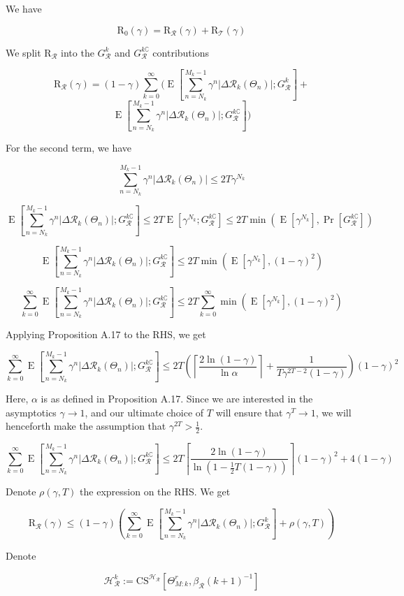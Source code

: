 \documentclass[a4paper]{article}
\newcommand{\AP}[1]{\left(#1\right)}
\newcommand{\AB}[1]{\left[#1\right]}
\newcommand{\Abs}[1]{\left\vert #1 \right\vert}
\newcommand{\Ceil}[1]{\left\lceil #1 \right\rceil}
\newcommand{\Pb}[1]{\operatorname{Pr}\AB{#1}}
\newcommand{\E}[1]{\operatorname{E}\AB{#1}}
\newcommand{\R}{\mathcal{R}}
\newcommand{\T}{\mathcal{T}}
\newcommand{\Hy}{\mathcal{H}}
\newcommand{\Reg}{\mathrm{R}}
\newcommand{\ET}{N}
\newcommand{\IT}{M}
\newcommand{\CSE}{G}
\newcommand{\CS}{\mathrm{CS}}
\begin{document}
We have

$$\Reg_0(\gamma)=\Reg_{\R}(\gamma)+\Reg_{\T}(\gamma)$$

We split $\Reg_{\R}$ into the $\CSE_\R^k$ and $\CSE_\R^{k\complement}$ contributions

$$\Reg_{\R}(\gamma)=(1-\gamma)\sum_{k=0}^\infty\Bigg(\E{\sum_{n=\ET_k}^{\IT_k-1}\gamma^{n}\Abs{\Delta\R_k\AP{\Theta_n}};\CSE_\R^k}+$$
$$\E{\sum_{n=\ET_k}^{\IT_k-1}\gamma^{n}\Abs{\Delta\R_k\AP{\Theta_n}};\CSE_\R^{k\complement}}\Bigg)$$

For the second term, we have

$$\sum_{n=\ET_k}^{\IT_k-1}\gamma^{n}\Abs{\Delta\R_k\AP{\Theta_n}}\leq2T\gamma^{N_k}$$

$$\E{\sum_{n=\ET_k}^{\IT_k-1}\gamma^{n}\Abs{\Delta\R_k\AP{\Theta_n}};\CSE_\R^{k\complement}}\leq2T\E{\gamma^{N_k};\CSE_\R^{k\complement}}\leq2T\min\AP{\E{\gamma^{N_k}},\Pb{\CSE_\R^{k\complement}}}$$

$$\E{\sum_{n=\ET_k}^{\IT_k-1}\gamma^{n}\Abs{\Delta\R_k\AP{\Theta_n}};\CSE_\R^{k\complement}}\leq2T\min\AP{\E{\gamma^{N_k}},(1-\gamma)^2}$$

$$\sum_{k=0}^\infty\E{\sum_{n=\ET_k}^{\IT_k-1}\gamma^{n}\Abs{\Delta\R_k\AP{\Theta_n}};\CSE_\R^{k\complement}}\leq 2T\sum_{k=0}^\infty\min\AP{\E{\gamma^{N_k}},(1-\gamma)^2}$$

Applying Proposition A.17 to the RHS, we get

$$\sum_{k=0}^\infty\E{\sum_{n=\ET_k}^{\IT_k-1}\gamma^{n}\Abs{\Delta\R_k\AP{\Theta_n}};\CSE_\R^{k\complement}}\leq2T\AP{\Ceil{\frac{2\ln(1-\gamma)}{\ln\alpha}}+\frac{1}{T\gamma^{2T-2}(1-\gamma)}}(1-\gamma)^2$$

Here, $\alpha$ is as defined in Proposition A.17. Since we are interested in the asymptotics $\gamma\rightarrow1$, and our ultimate choice of $T$ will ensure that $\gamma^T\rightarrow1$, we will henceforth make the assumption that $\gamma^{2T}>\frac{1}{2}$.

$$\sum_{k=0}^\infty\E{\sum_{n=\ET_k}^{\IT_k-1}\gamma^{n}\Abs{\Delta\R_k\AP{\Theta_n}};\CSE_\R^{k\complement}}\leq2T\Ceil{\frac{2\ln(1-\gamma)}{\ln\AP{1-\frac{1}{2}T(1-\gamma)}}}(1-\gamma)^2+4(1-\gamma)$$

Denote $\rho(\gamma,T)$ the expression on the RHS. We get

$$\Reg_\R(\gamma)\leq(1-\gamma)\AP{\sum_{k=0}^\infty\E{\sum_{n=\ET_k}^{\IT_k-1}\gamma^{n}\Abs{\Delta\R_k\AP{\Theta_n}};\CSE_\R^k}+\rho(\gamma,T)}$$

Denote

$$\Hy_\R^k:=\CS^{\Hy_\R}\AB{\Theta_{M:k}^r,\beta_\R(k+1)^{-1}}$$
\end{document}
